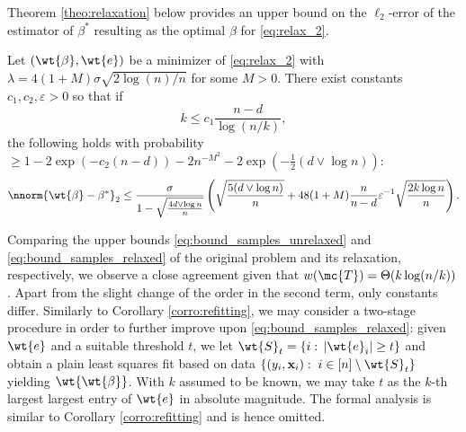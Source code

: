 \documentclass[11pt]{article}
\def\epss{\varepsilon}
\begin{document}
Theorem \ref{theo:relaxation} below provides an upper bound on the $\ell_2$-error of the estimator of $\beta^*$ resulting as the optimal $\beta$ for \eqref{eq:relax_2}.
\begin{theo}\label{theo:relaxation} Let $(\wt{\beta}, \wt{e})$ be a minimizer of \eqref{eq:relax_2} with $\lambda = 4 (1 + M) \sigma \sqrt{2 \log(n) / n}$ for some $M > 0$. There exist constants $c_1, c_2, \epss > 0$ so that if
\begin{equation*}
k \leq c_1 \frac{n-d}{\log(n/k)},
\end{equation*}
the following holds with probability $\geq 1 - 2 \exp(-c_2 (n-d)) - 2n^{-M^2} - 2 \exp \left(-\frac{1}{2} (d \vee \log n) \right)$:
\begin{equation}\label{eq:bound_samples_relaxed}
\nnorm{\wt{\beta} - \beta^*}_2 \leq \frac{\sigma}{1 - \sqrt{\frac{4 d \vee \log n}{n}}} \left(\sqrt{\frac{5 (d \vee \log n)}{n}}  +  48 (1 + M) \frac{n}{n-d} \epss^{-1} \sqrt{\frac{2k \log n}{n}}\right).  
\end{equation}  
\end{theo}
\noindent Comparing the upper bounds \eqref{eq:bound_samples_unrelaxed} and \eqref{eq:bound_samples_relaxed} of the original problem and its relaxation, respectively, we observe a close agreement given that $w(\mc{T}) = \Theta(k \log(n/k))$. Apart from the slight change of the order in the second term, only constants differ. Similarly to Corollary \ref{corro:refitting}, we may consider a two-stage procedure in order to further improve upon \eqref{eq:bound_samples_relaxed}: given
$\wt{e}$ and a suitable threshold $t$, we let $\wt{S}_t = \{i: \, |\wt{e}_i| \geq t \}$ and obtain a plain least squares fit based on data $\{(y_i, \mathbf{x}_i): \; i
\in [n] \setminus \wt{S}_t \}$ yielding $\wt{\wt{\beta}}$. With $k$ assumed to be known, we may take $t$ as the $k$-th largest largest entry of $\wt{e}$ in absolute magnitude. The formal analysis is similar to Corollary \ref{corro:refitting} and is hence omitted.
\end{document}
